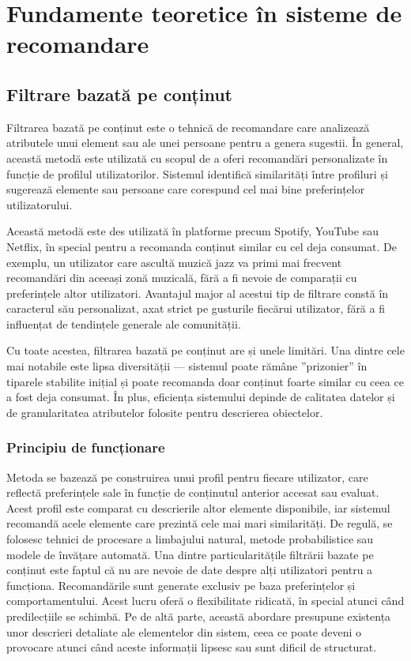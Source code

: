 \chapter{Fundamente teoretice în sisteme de recomandare}
\label{chap:ch3}

\section{Filtrare bazată pe conținut}
\label{sec:ch3sec1}

Filtrarea bazată pe conținut este o tehnică de recomandare care analizează atributele unui element sau ale unei persoane pentru a genera sugestii.
În general, această metodă este utilizată cu scopul de a oferi recomandări personalizate în funcție de profilul utilizatorilor.
Sistemul identifică similarități între profiluri și sugerează elemente sau persoane care corespund cel mai bine preferințelor utilizatorului.
\cite{kumar2018recommendation}
\par
Această metodă este des utilizată în platforme precum Spotify, YouTube sau Netflix, în special pentru a recomanda conținut similar cu cel deja consumat. 
De exemplu, un utilizator care ascultă muzică jazz va primi mai frecvent recomandări din aceeași zonă muzicală, fără a fi nevoie de comparații cu preferințele altor utilizatori. 
Avantajul major al acestui tip de filtrare constă în caracterul său personalizat, axat strict pe gusturile fiecărui utilizator, fără a fi influențat de tendințele generale ale comunității.
\par
Cu toate acestea, filtrarea bazată pe conținut are și unele limitări. 
Una dintre cele mai notabile este lipsa diversității — sistemul poate rămâne ”prizonier” în tiparele stabilite inițial și poate recomanda doar conținut foarte similar cu ceea ce a fost deja consumat. 
În plus, eficiența sistemului depinde de calitatea datelor și de granularitatea atributelor folosite pentru descrierea obiectelor.

\subsection{Principiu de funcționare}
Metoda se bazează pe construirea unui profil pentru fiecare utilizator, care reflectă preferințele sale în funcție de conținutul anterior accesat sau evaluat. 
Acest profil este comparat cu descrierile altor elemente disponibile, iar sistemul recomandă acele elemente care prezintă cele mai mari similarități.
De regulă, se folosesc tehnici de procesare a limbajului natural, metode probabilistice sau modele de învățare automată.
Una dintre particularitățile filtrării bazate pe conținut este faptul că nu are nevoie de date despre alți utilizatori pentru a funcționa. Recomandările sunt generate exclusiv pe baza preferințelor și comportamentului.
Acest lucru oferă o flexibilitate ridicată, în special atunci când predilecțiile se schimbă. Pe de altă parte, această abordare presupune existența unor descrieri detaliate ale elementelor din sistem, ceea ce poate deveni o provocare atunci când aceste informații lipsesc sau sunt dificil de structurat.
\cite{ISINKAYE2015261}
